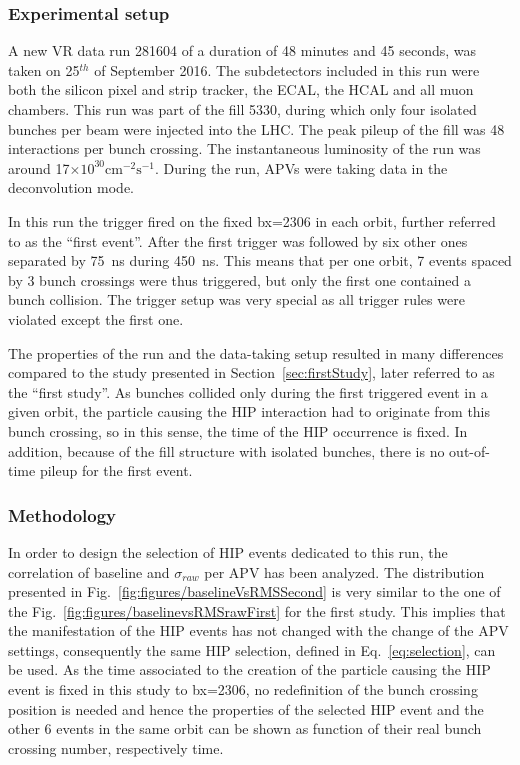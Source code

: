 
\subsubsection{Experimental setup}

A new VR data run 281604 of a duration of 48 minutes and 45 seconds, was taken on 25$^{th}$ of September 2016. The subdetectors included in this run were both the silicon pixel and strip tracker, the ECAL, the HCAL and all muon chambers. This run was part of the fill 5330, during which only four isolated bunches per beam were injected into the LHC. The peak pileup of the fill was 48 interactions per bunch crossing. The instantaneous luminosity of the run was around 17$\times 10^{30} \mathrm{cm^{-2} s^{-1}}$. During the run, APVs were taking data in the deconvolution mode. 

In this run the trigger fired on the fixed bx=2306 in each orbit, further referred to as the ``first event''. After the first trigger was followed by six other ones separated by 75~ns during 450~ns. This means that per one orbit, 7 events spaced by 3 bunch crossings were thus triggered, but only the first one contained a bunch collision. The trigger setup was very special as all trigger rules were violated except the first one.


The properties of the run and  the data-taking setup resulted in many differences compared to the study presented in Section~\ref{sec:firstStudy}, later referred to as the ``first study''. As bunches collided only during the first triggered event in a given orbit, the particle causing the HIP interaction had to originate from this bunch crossing, so in this sense, the time of the HIP occurrence is fixed. In addition, because of the fill structure with isolated bunches, there is no out-of-time pileup for the first event.

\subsubsection{Methodology}

In order to design the selection of HIP events dedicated to this run, the correlation of baseline and $\sigma_{raw}$ per APV has been analyzed. The distribution presented in Fig.~\ref{fig:figures/baselineVsRMSSecond} is very similar to the one of the Fig.~\ref{fig:figures/baselinevsRMSrawFirst} for the first study. This implies that the manifestation of the HIP events has not changed with the change of the APV settings, consequently the same HIP selection, defined in Eq.~\ref{eq:selection}, can be used. As the time associated to the creation of the particle causing the HIP event is fixed in this study to bx=2306, no redefinition of the bunch crossing position is needed and hence the properties of the selected HIP event and the other 6 events in the same orbit can be shown as function of their real bunch crossing number, respectively time.

